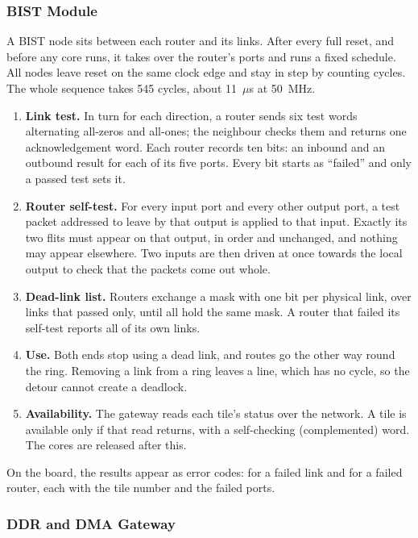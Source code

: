 \documentclass[11pt,a4paper]{article}
\newcommand{\code}[1]{\texttt{\detokenize{#1}}}
\begin{document}
\subsubsection{BIST Module}

A BIST node sits between each router and its links. After every full reset,
and before any core runs, it takes over the router's ports and runs a fixed
schedule. All nodes leave reset on the same clock edge and stay in step by
counting cycles. The whole sequence takes 545 cycles, about 11~$\mu$s at
50~MHz.

\begin{enumerate}
\item \textbf{Link test.} In turn for each direction, a router sends six test
words alternating all-zeros and all-ones; the neighbour checks them and
returns one acknowledgement word. Each router records ten bits: an inbound
and an outbound result for each of its five ports. Every bit starts as
``failed'' and only a passed test sets it.
\item \textbf{Router self-test.} For every input port and every other output
port, a test packet addressed to leave by that output is applied to that
input. Exactly its two flits must appear on that output, in order and
unchanged, and nothing may appear elsewhere. Two inputs are then driven at
once towards the local output to check that the packets come out whole.
\item \textbf{Dead-link list.} Routers exchange a mask with one bit per
physical link, over links that passed only, until all hold the same mask. A
router that failed its self-test reports all of its own links.
\item \textbf{Use.} Both ends stop using a dead link, and routes go the other
way round the ring. Removing a link from a ring leaves a line, which has no
cycle, so the detour cannot create a deadlock.
\item \textbf{Availability.} The gateway reads each tile's status over the
network. A tile is available only if that read returns, with a self-checking
(complemented) word. The cores are released after this.
\end{enumerate}

On the board, the results appear as error codes: \code{E} for a failed link
and \code{F} for a failed router, each with the tile number and the failed
ports.

\subsubsection{DDR and DMA Gateway}
\end{document}
